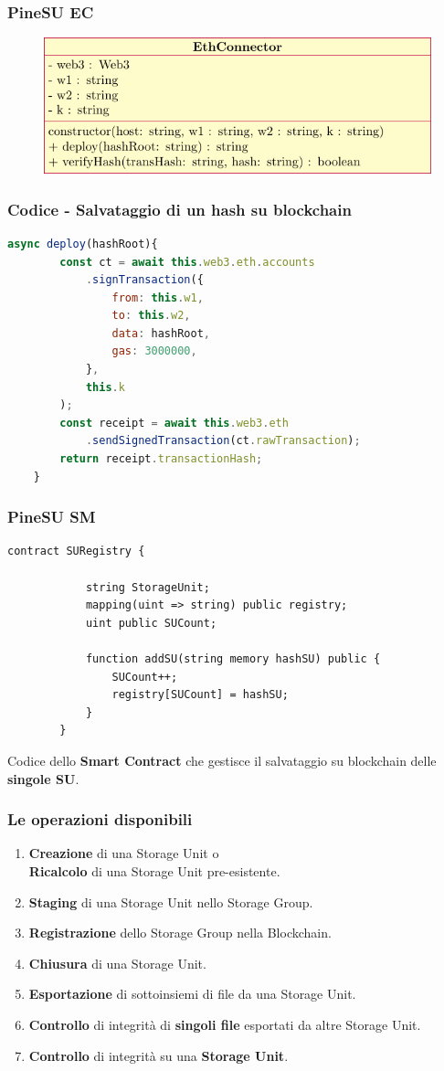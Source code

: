 \documentclass{beamer}
\begin{document}
\begin{frame}
	\frametitle{PineSU EC}
	\begin{figure}
		\includegraphics[width=\textwidth]{figures/umlec.pdf}
	\end{figure}
\end{frame}

\begin{frame}[fragile]
	\frametitle{Codice - Salvataggio di un hash su blockchain}
	\begin{lstlisting}[language=JavaScript, numbers=none]
	async deploy(hashRoot){
		const ct = await this.web3.eth.accounts
			.signTransaction({
				from: this.w1,
				to: this.w2,
				data: hashRoot,
				gas: 3000000,
			},
			this.k
		);
		const receipt = await this.web3.eth
			.sendSignedTransaction(ct.rawTransaction);
		return receipt.transactionHash;
	}
	\end{lstlisting}
\end{frame}

\begin{frame}[fragile]
	\frametitle{PineSU SM}
	\begin{lstlisting}[language=Solidity, numbers=none]
		contract SURegistry {
		
			string StorageUnit;
			mapping(uint => string) public registry;
			uint public SUCount;
		
			function addSU(string memory hashSU) public {
				SUCount++;
				registry[SUCount] = hashSU;
			}
		}
	\end{lstlisting}
	Codice dello \textbf{Smart Contract} che gestisce il salvataggio su blockchain delle \textbf{singole SU}.
\end{frame}

\begin{frame}
	\frametitle{Le operazioni disponibili}
	\begin{enumerate}%
		\item \textbf{Creazione} di una Storage Unit o \\ \textbf{Ricalcolo} di una Storage Unit pre-esistente.
		\item \textbf{Staging} di una Storage Unit nello Storage Group.
		\item \textbf{Registrazione} dello Storage Group nella Blockchain.
		\item \textbf{Chiusura} di una Storage Unit.
		\item \textbf{Esportazione} di sottoinsiemi di file da una Storage Unit.
		\item \textbf{Controllo} di integrità di \textbf{singoli file} esportati da altre Storage Unit.
		\item \textbf{Controllo} di integrità su una \textbf{Storage Unit}.
	\end{enumerate}
\end{frame}
\end{document}
